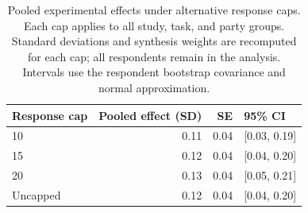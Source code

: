 \begin{table}[ht]
\centering
\caption{Pooled experimental effects under alternative response caps. Each cap applies to all study, task, and party groups. Standard deviations and synthesis weights are recomputed for each cap; all respondents remain in the analysis. Intervals use the respondent bootstrap covariance and normal approximation.}
\label{tab:pooled_sensitivity}
\begin{tabular}{lrrl}
  \toprule
Response cap & Pooled effect (SD) & SE & 95\% CI \\
  \midrule
10 & 0.11 & 0.04 & [0.03, 0.19] \\
  15 & 0.12 & 0.04 & [0.04, 0.20] \\
  20 & 0.13 & 0.04 & [0.05, 0.21] \\
  Uncapped & 0.12 & 0.04 & [0.04, 0.20] \\
   \bottomrule
\end{tabular}
\end{table}
